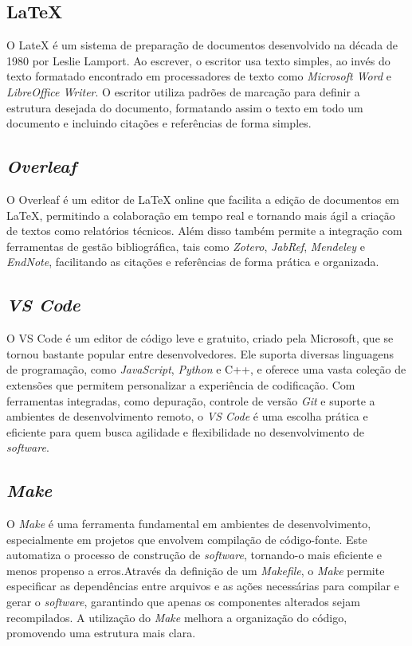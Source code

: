 \subsection{\LaTeX}
\label{chap3:subsec:latex}
O \gls{LateX} é um sistema de preparação de documentos desenvolvido na década de 1980 por Leslie Lamport. Ao escrever, o escritor usa texto simples, ao invés do texto formatado encontrado em processadores de texto como \textit{Microsoft Word} e \textit{LibreOffice Writer}. O escritor utiliza padrões de marcação para definir a estrutura desejada do documento, formatando assim o texto em todo um documento e incluindo citações e referências de forma simples.


\subsection{\textit{Overleaf}}
\label{chap3:subsec:overleaf}
O Overleaf é um editor de LaTeX online que facilita a edição de documentos em LaTeX, permitindo a colaboração em tempo real e tornando mais ágil a criação de textos como relatórios técnicos. Além disso também permite a integração com ferramentas de gestão bibliográfica, tais como \textit{Zotero}, \textit{JabRef}, \textit{Mendeley} e \textit{EndNote}, facilitando as citações e referências de forma prática e organizada.


\subsection{\textit{\acs*{VS Code}}}
\label{chap3:subsec:vscode}
O \gls{VS Code} é um editor de código leve e gratuito, criado pela Microsoft, que se tornou bastante popular entre desenvolvedores. Ele suporta diversas linguagens de programação, como \textit{JavaScript}, \textit{Python} e C++\cite{devdocsDevDocsx2014CPP}, e oferece uma vasta coleção de extensões que permitem personalizar a experiência de codificação. Com ferramentas integradas, como depuração, controle de versão \textit{Git}\cite{gitscm} e suporte a ambientes de desenvolvimento remoto, o \textit{\ac{VS Code}} é uma escolha prática e eficiente para quem busca agilidade e flexibilidade no desenvolvimento de \textit{software}.

\newpage

\subsection{\textit{Make}}
\label{chap3:subsec:make}
O \textit{Make} é uma ferramenta fundamental em ambientes de desenvolvimento, especialmente em projetos que envolvem compilação de código-fonte. Este automatiza o processo de construção de \textit{software}, tornando-o mais eficiente e menos propenso a erros.Através da definição de um \textit{Makefile}, o \textit{Make} permite especificar as dependências entre arquivos e as ações necessárias para compilar e gerar o \textit{software}, garantindo que apenas os componentes alterados sejam recompilados. A utilização do \textit{Make} melhora a organização do código, promovendo uma estrutura mais clara.

